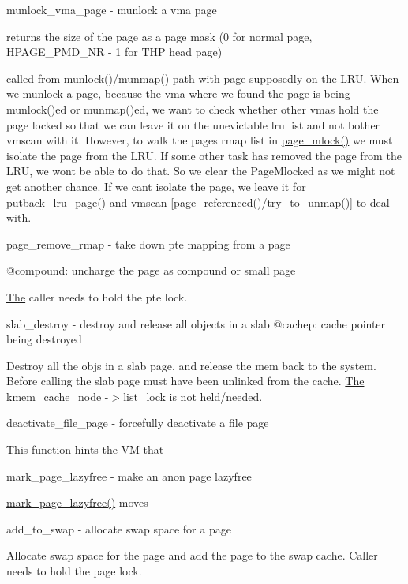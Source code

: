 munlock\+\_\+vma\+\_\+page -\/ munlock a vma page

returns the size of the page as a page mask (0 for normal page, H\+P\+A\+G\+E\+\_\+\+P\+M\+D\+\_\+\+NR -\/ 1 for T\+HP head page)

called from munlock()/munmap() path with page supposedly on the L\+RU. When we munlock a page, because the vma where we found the page is being munlock()ed or munmap()ed, we want to check whether other vmas hold the page locked so that we can leave it on the unevictable lru list and not bother vmscan with it. However, to walk the page\textquotesingle{}s rmap list in \mbox{\hyperlink{rmap_8c_ab6012cc8920afb826bb1e3e5cd80cf94}{page\+\_\+mlock()}} we must isolate the page from the L\+RU. If some other task has removed the page from the L\+RU, we won\textquotesingle{}t be able to do that. So we clear the Page\+Mlocked as we might not get another chance. If we can\textquotesingle{}t isolate the page, we leave it for \mbox{\hyperlink{mm_2internal_8h_af1e9e30255520f222b4b4761bf018ac0}{putback\+\_\+lru\+\_\+page()}} and vmscan \mbox{[}\mbox{\hyperlink{rmap_8c_a81111cdf3621a2f26a915031cf1a3c29}{page\+\_\+referenced()}}/try\+\_\+to\+\_\+unmap()\mbox{]} to deal with.

page\+\_\+remove\+\_\+rmap -\/ take down pte mapping from a page

@compound\+: uncharge the page as compound or small page

\mbox{\hyperlink{classThe}{The}} caller needs to hold the pte lock.

slab\+\_\+destroy -\/ destroy and release all objects in a slab @cachep\+: cache pointer being destroyed

Destroy all the objs in a slab page, and release the mem back to the system. Before calling the slab page must have been unlinked from the cache. \mbox{\hyperlink{classThe}{The}} \mbox{\hyperlink{structkmem__cache__node}{kmem\+\_\+cache\+\_\+node}} -\/$>$list\+\_\+lock is not held/needed.

deactivate\+\_\+file\+\_\+page -\/ forcefully deactivate a file page

This function hints the VM that

mark\+\_\+page\+\_\+lazyfree -\/ make an anon page lazyfree

\mbox{\hyperlink{mm_2swap_8c_a32522ef0c1c8d91f602308a7f86c875d}{mark\+\_\+page\+\_\+lazyfree()}} moves

add\+\_\+to\+\_\+swap -\/ allocate swap space for a page

Allocate swap space for the page and add the page to the swap cache. Caller needs to hold the page lock.

